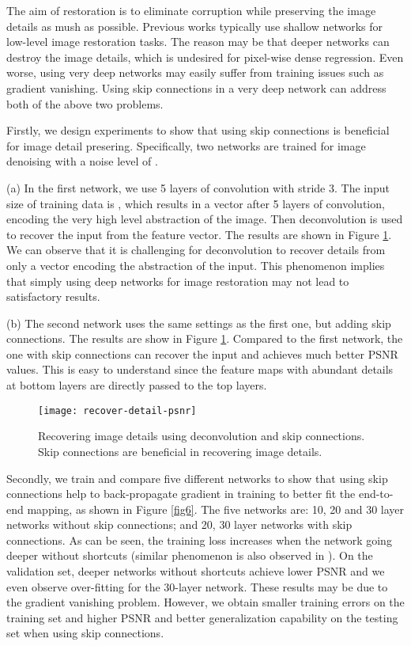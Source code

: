 \documentclass[10pt,journal,compsoc]{IEEEtran}
\begin{document}
The aim of restoration is to eliminate corruption while preserving the image details
as mush as possible. Previous works typically use shallow networks for low-level image
restoration tasks. The reason may be that deeper networks can destroy the image details,
which is undesired for pixel-wise dense regression. Even worse, using very deep networks
may easily suffer from training issues such as gradient vanishing. Using skip
connections in a very deep network can address both  of the above two problems.

Firstly, we design experiments to show that using skip connections is beneficial for
image detail presering. Specifically, two networks are trained for image denoising
with a noise level of .

(a) In the first network, we use 5 layers of  convolution with stride 3.
The input size of training data is , which results in a vector after
5 layers of convolution, encoding the very high level abstraction of the image. Then
deconvolution is used to recover the input from the feature vector. The results are
shown in Figure \ref{fig5}. We can observe that it is challenging for deconvolution to recover
details from only a vector encoding the abstraction of the input. This phenomenon
implies that  simply using deep networks for image restoration may not lead to satisfactory results.


(b) The second network uses the same settings as the first one, but adding
skip connections. The results are show in Figure \ref{fig5}. Compared to the first
network, the one with skip connections can recover the input and achieves much
better PSNR values. This is easy to understand since the feature maps with abundant
details at bottom layers are directly passed to the top layers.

\begin{figure}[htb!]
\centering
\texttt{[image: recover-detail-psnr]}
\caption{Recovering image details using deconvolution and skip connections. Skip
connections are beneficial in recovering image details.}
\label{fig5}
\end{figure}

Secondly, we train and compare five different networks to show that using skip
connections help to back-propagate gradient in training to better fit the end-to-end
mapping, as shown in Figure \ref{fig6}. The five networks are: 10, 20 and 30 layer
networks without skip connections;  and 20, 30 layer networks with skip connections.
As  can be seen, the training loss increases when the network going deeper without
shortcuts (similar phenomenon is also observed in \cite{DBLP:journals/corr/HeZRS15}).
On the validation set, deeper networks without shortcuts achieve lower PSNR and we
even observe over-fitting for the 30-layer network. These results may be due to  the
gradient vanishing problem. However, we obtain smaller training errors on the training set and
higher PSNR and better generalization capability on the testing set when using skip connections.
\end{document}
